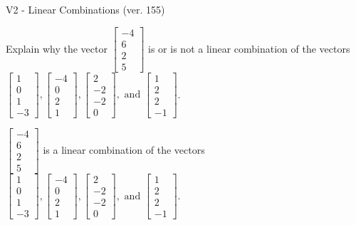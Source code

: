 \begin{exercise}
  \begin{exerciseTitle}V2 - Linear Combinations (ver. 155)\end{exerciseTitle}
  \begin{exerciseStatement}
    Explain why the vector \(\left[\begin{array}{c}
-4 \\
6 \\
2 \\
5
\end{array}\right]\)  is or is not a linear 
	combination of the vectors \(\left[\begin{array}{c}
1 \\
0 \\
1 \\
-3
\end{array}\right] , \left[\begin{array}{c}
-4 \\
0 \\
2 \\
1
\end{array}\right] , \left[\begin{array}{c}
2 \\
-2 \\
-2 \\
0
\end{array}\right] , \text{ and } \left[\begin{array}{c}
1 \\
2 \\
2 \\
-1
\end{array}\right]\).
	


  \end{exerciseStatement}
  \begin{exerciseAnswer}
   \(\left[\begin{array}{c}
-4 \\
6 \\
2 \\
5
\end{array}\right]\) 
  	 is  
	a linear combination of the vectors \(\left[\begin{array}{c}
1 \\
0 \\
1 \\
-3
\end{array}\right] , \left[\begin{array}{c}
-4 \\
0 \\
2 \\
1
\end{array}\right] , \left[\begin{array}{c}
2 \\
-2 \\
-2 \\
0
\end{array}\right] , \text{ and } \left[\begin{array}{c}
1 \\
2 \\
2 \\
-1
\end{array}\right]\).


\end{exerciseAnswer}
\end{exercise}
